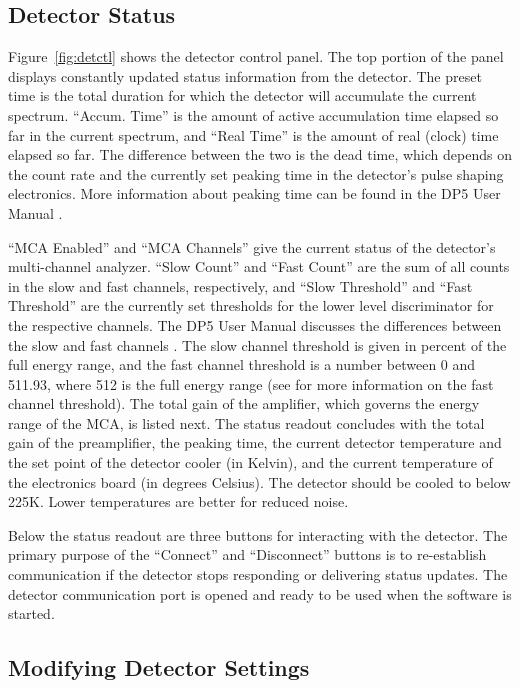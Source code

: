 \subsection{Detector Status}

Figure~\ref{fig:detctl} shows the detector control panel. The top portion of the
panel displays constantly updated status information from the detector. The
preset time is the total duration for which the detector will accumulate the
current spectrum. ``Accum. Time'' is the amount of active accumulation time
elapsed so far in the current spectrum, and ``Real Time'' is the amount of real
(clock) time elapsed so far. The difference between the two is the dead time,
which depends on the count rate and the currently set peaking time in the
detector's pulse shaping electronics. More information about peaking time can be
found in the DP5 User Manual \cite[p.~8]{dp5_user_man}.

``MCA Enabled'' and ``MCA Channels'' give the current status of the detector's
multi-channel analyzer. ``Slow Count'' and ``Fast Count'' are the sum of all
counts in the slow and fast channels, respectively, and ``Slow Threshold'' and
``Fast Threshold'' are the currently set thresholds for the lower level
discriminator for the respective channels.  The DP5 User Manual discusses the
differences between the slow and fast channels \cite[p.~7-8]{dp5_user_man}. The
slow channel threshold is given in percent of the full energy range, and the
fast channel threshold is a number between 0 and 511.93, where 512 is the full
energy range (see \cite[p.~162]{dp5_prog_guide} for more information on the fast
channel threshold).  The total gain of the amplifier, which governs the energy
range of the MCA, is listed next. The status readout concludes with the total
gain of the preamplifier, the peaking time, the current detector temperature and
the set point of the detector cooler (in Kelvin), and the current temperature of
the electronics board (in degrees Celsius). The detector should be cooled to
below 225K. Lower temperatures are better for reduced noise.

Below the status readout are three buttons for interacting with the
detector. The primary purpose of the ``Connect'' and ``Disconnect'' buttons is
to re-establish communication if the detector stops responding or delivering
status updates. The detector communication port is opened and ready to be used
when the software is started.

\subsection{Modifying Detector Settings}

